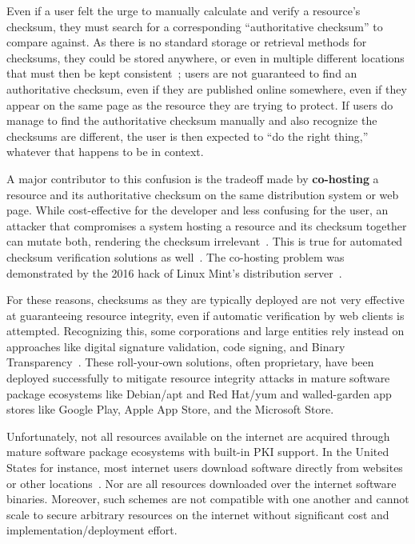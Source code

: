 Even if a user felt the urge to manually calculate and verify a resource's
checksum, they must search for a corresponding ``authoritative checksum'' to
compare against. As there is no standard storage or retrieval methods for
checksums, they could be stored anywhere, or even in multiple different
locations that must then be kept consistent~\cite{Cherubini}; users are not
guaranteed to find an authoritative checksum, even if they are published online
somewhere, even if they appear on the same page as the resource they are trying
to protect. If users do manage to find the authoritative checksum manually and
also recognize the checksums are different, the user is then expected to ``do
the right thing,'' whatever that happens to be in context.

A major contributor to this confusion is the tradeoff made by
\textbf{co-hosting} a resource and its authoritative checksum on the same
distribution system or web page. While cost-effective for the developer and less
confusing for the user, an attacker that compromises a system hosting a resource
and its checksum together can mutate both, rendering the checksum
irrelevant~\cite{Stickler}. This is true for automated checksum verification
solutions as well~\cite{Cherubini}. The co-hosting problem was demonstrated by
the 2016 hack of Linux Mint's distribution server~\cite{SCA-MINT1, SCA-MINT2}.

For these reasons, checksums as they are typically deployed are not very
effective at guaranteeing resource integrity, even if automatic verification by
web clients is attempted. Recognizing this, some corporations and large entities
rely instead on approaches like digital signature validation, code signing, and
Binary Transparency~\cite{PKI, BinaryTransparency}. These roll-your-own
solutions, often proprietary, have been deployed successfully to mitigate
resource integrity attacks in mature software package ecosystems like Debian/apt
and Red Hat/yum and walled-garden app stores like Google Play, Apple App Store,
and the Microsoft Store.

Unfortunately, not all resources available on the internet are acquired through
mature software package ecosystems with built-in PKI support. In the United
States for instance, most internet users download software directly from
websites or other locations~\cite{Cherubini, Ryan}. Nor are all resources
downloaded over the internet software binaries. Moreover, such schemes are not
compatible with one another and cannot scale to secure arbitrary resources on
the internet without significant cost and implementation/deployment effort.

